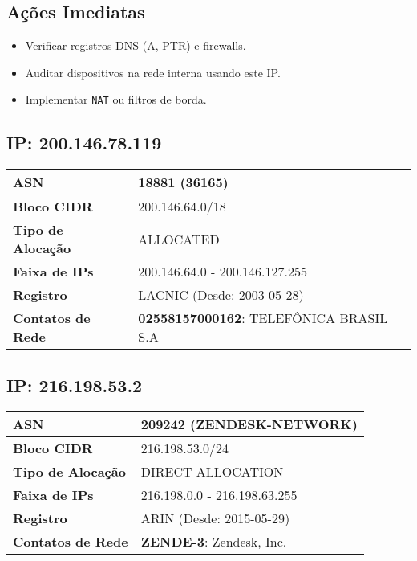 \subsection*{Ações Imediatas}
\begin{itemize}
\item Verificar registros DNS (A, PTR) e firewalls.
\item Auditar dispositivos na rede interna usando este IP.
\item Implementar \texttt{NAT} ou filtros de borda.
\end{itemize}


    \subsection{IP: 200.146.78.119}
    \begin{tabular}{|l|l|}
    \hline
    \textbf{ASN} & 18881 (36165) \\ \hline
    \textbf{Bloco CIDR} & 200.146.64.0/18 \\ \hline
    \textbf{Tipo de Alocação} & ALLOCATED \\ \hline
    \textbf{Faixa de IPs} & 200.146.64.0 - 200.146.127.255 \\ \hline
    \textbf{Registro} & LACNIC (Desde: 2003-05-28) \\ \hline
        
\textbf{Contatos de Rede} & \textbf{02558157000162}: TELEFÔNICA BRASIL S.A 
\\ \hline
\end{tabular}


    \subsection{IP: 216.198.53.2}
    \begin{tabular}{|l|l|}
    \hline
    \textbf{ASN} & 209242 (ZENDESK-NETWORK) \\ \hline
    \textbf{Bloco CIDR} & 216.198.53.0/24 \\ \hline
    \textbf{Tipo de Alocação} & DIRECT ALLOCATION \\ \hline
    \textbf{Faixa de IPs} & 216.198.0.0 - 216.198.63.255 \\ \hline
    \textbf{Registro} & ARIN (Desde: 2015-05-29) \\ \hline
        
\textbf{Contatos de Rede} & \textbf{ZENDE-3}: Zendesk, Inc. 
\\ \hline
\end{tabular}


